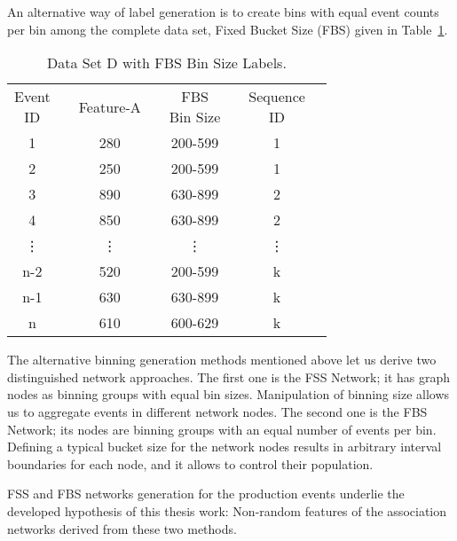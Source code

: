 An alternative way of label generation is to create bins with equal event counts per bin among the complete data set, Fixed Bucket Size (FBS) given in Table~\ref{Tab: D-dataset-FBS}.
\begin{table}[ht!]
	\centering
	\begin{tabular}{|ccccccc|l}
		\cline{1-7}
		\makecell{Event\\ID} 	&& Feature-A    	&& \makecell{FBS\\Bin Size}&& \makecell{Sequence\\ID} &  \\ \cline{1-7}
		1 	      && 280	    && 200-599	&& 1 		   &  \\
		2 		  && 250	    && 200-599	&& 1 		   &  \\
		3 	      && 890	    && 630-899	&& 2 		   &  \\
		4 		  && 850	    && 630-899	&& 2 		   &  \\
		\vdots	  && \vdots  	&& \vdots	&& \vdots 	   &  \\
		n-2 	  && 520	    && 200-599	&& k 		   &  \\
		n-1       && 630	    && 630-899	&& k 		   &  \\
		n 		  && 610	    && 600-629	&& k 		   &  \\ \cline{1-7}
	\end{tabular}
	\caption{Data Set D with FBS Bin Size Labels.}
	\label{Tab: D-dataset-FBS}
\end{table}
The alternative binning generation methods mentioned above let us derive two distinguished network approaches. The first one is the FSS Network; it has graph nodes as binning groups with equal bin sizes. Manipulation of binning size allows us to aggregate events in different network nodes. The second one is the FBS Network; its nodes are binning groups with an equal number of events per bin. Defining a typical bucket size for the network nodes results in arbitrary interval boundaries for each node, and it allows to control their population.


{\color{red}FSS and FBS networks generation for the production events underlie the developed hypothesis of this thesis work: Non-random features of the association networks derived from these two methods.}
